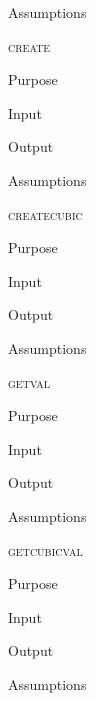 \documentclass[pdftex, 11pt]{article}
\begin{document}
\begin{description}
\begin{description}
			\item{Assumptions}


		\end{description}


	\item{\textsc{create}}
		\begin{description}
			\item{Purpose}


			\item{Input}


			\item{Output}


			\item{Assumptions}


		\end{description}


	\item{\textsc{createcubic}}
		\begin{description}
			\item{Purpose}


			\item{Input}


			\item{Output}


			\item{Assumptions}


		\end{description}


	\item{\textsc{getval}}
		\begin{description}
			\item{Purpose}


			\item{Input}


			\item{Output}


			\item{Assumptions}


		\end{description}


	\item{\textsc{getcubicval}}
		\begin{description}
			\item{Purpose}


			\item{Input}


			\item{Output}


			\item{Assumptions}


		\end{description}


\end{description}
\end{document}
